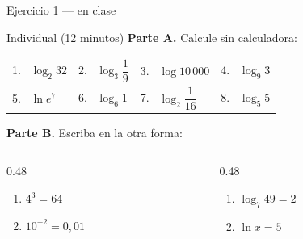 \documentclass[aspectratio=169,10pt]{beamer}
\begin{document}
\begin{frame}{Ejercicio 1 — en clase}
  \begin{alertblock}{Individual (12 minutos)}
    \scriptsize
    \textbf{Parte A.} Calcule sin calculadora:

    \vspace{0.15cm}
    \centering
    \begin{tabular}{@{}llll@{}}
      1. \ $\log_{2}32$ & 2. \ $\log_{3}\dfrac{1}{9}$ &
      3. \ $\log 10\,000$ & 4. \ $\log_{9}3$ \\[0.9em]
      5. \ $\ln e^{7}$ & 6. \ $\log_{6}1$ &
      7. \ $\log_{2}\dfrac{1}{16}$ & 8. \ $\log_{5}5$ \\
    \end{tabular}

    \vspace{0.2cm}
    \raggedright
    \textbf{Parte B.} Escriba en la otra forma:

    \vspace{0.1cm}
    \begin{columns}[T,onlytextwidth]
      \begin{column}{0.48\textwidth}
        \begin{enumerate}\setlength{\itemsep}{-0.02cm}
          \item $4^{3} = 64$
          \item $10^{-2} = 0{,}01$
        \end{enumerate}
      \end{column}
      \begin{column}{0.48\textwidth}
        \begin{enumerate}\setlength{\itemsep}{-0.02cm}
          \setcounter{enumi}{2}
          \item $\log_{7}49 = 2$
          \item $\ln x = 5$
        \end{enumerate}
      \end{column}
    \end{columns}
  \end{alertblock}
\end{frame}
\end{document}

